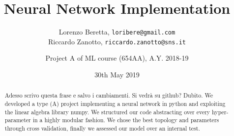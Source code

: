 \documentclass[12pt]{article}
\title{Neural Network Implementation}
\author{Lorenzo Beretta, \texttt{loribere@gmail.com}\\
  Riccardo Zanotto, \texttt{riccardo.zanotto@sns.it}
  \and Project A of ML course (654AA), A.Y. 2018-19}
\date{30th May 2019}
\begin{document}
\maketitle

\begin{abstract}
  Adesso scrivo questa frase e salvo i cambiamenti. Si vedrà su github? Dubito.
  We developed a type (A) project implementing a neural network in python and exploiting the linear algebra library numpy. We structured our code abstracting over every hyper-parameter in a highly modular fashion. We chose the best topology and parameters through cross validation, finally we assessed our model over an internal test.  
\end{abstract}






\end{document}
